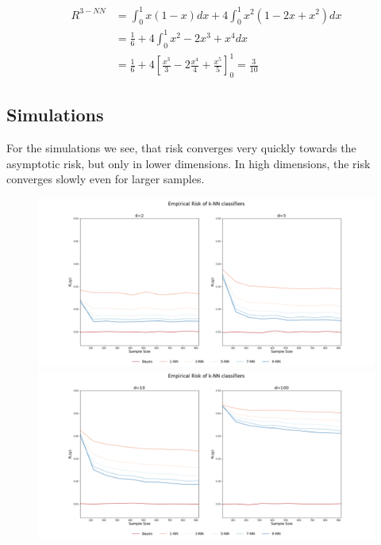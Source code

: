 \documentclass[a4paper, 11pt]{article} %
\begin{document}
\begin{align*}
R ^ { 3 - N N } &=\int _ { 0 } ^ { 1 } x ( 1 - x ) d x + 4 \int _ { 0 } ^ { 1 } x ^ { 2 } \left( 1 - 2 x + x ^ { 2 } \right) d x \\
&= \frac { 1 } { 6 } + 4 \int _ { 0 } ^ { 1 } x ^ { 2 } - 2 x ^ { 3 } + x ^ { 4 } d x \\
&= \frac { 1 } { 6 } + 4 \left[ \frac { x ^ { 3 } } { 3 } - 2 \frac { x ^ { 4 } } { 4 } + \frac { x ^ { 5 } } { 5 } \right] _ { 0 } ^ { 1 } = \frac{3}{10}
\end{align*}

\newpage
\subsection*{Simulations}

For the simulations we see, that risk converges very quickly towards the asymptotic risk, but only in lower dimensions. In high dimensions, the risk converges slowly even for larger samples.

\begin{figure}[H]
\centering
\includegraphics[scale= 0.3]{Emp_Risk_d_2_5}
\includegraphics[scale= 0.3]{Emp_Risk_d_10_100}
\end{figure}
\end{document}
